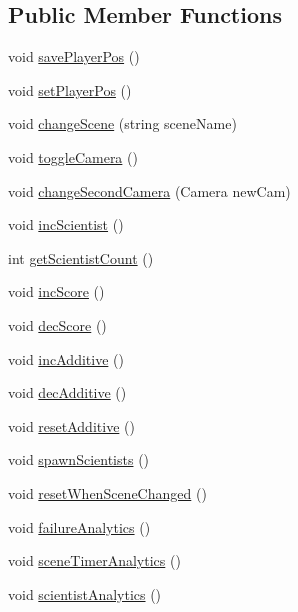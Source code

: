 \subsection*{Public Member Functions}
\begin{DoxyCompactItemize}
\item 
void \hyperlink{class_global_controller_a5a71c2551eef6be2304110c96a31cb55}{save\+Player\+Pos} ()
\item 
void \hyperlink{class_global_controller_a3424caeaad35cc27c958d453ac7586fc}{set\+Player\+Pos} ()
\item 
void \hyperlink{class_global_controller_af0ae9de1725a09bce4a16209a5b638ea}{change\+Scene} (string scene\+Name)
\item 
void \hyperlink{class_global_controller_af4ff92ac33a69fb09fd302cd775b9e96}{toggle\+Camera} ()
\item 
void \hyperlink{class_global_controller_a58e7beb6be20379f00ed7f63c0a1890a}{change\+Second\+Camera} (Camera new\+Cam)
\item 
void \hyperlink{class_global_controller_a84e2d66e0c6c9baa79963554f6f3b2bd}{inc\+Scientist} ()
\item 
int \hyperlink{class_global_controller_aa5e702709ea41c25a8a537556671ff47}{get\+Scientist\+Count} ()
\item 
void \hyperlink{class_global_controller_afe90e502d26e3585ef975555464bc323}{inc\+Score} ()
\item 
void \hyperlink{class_global_controller_a3c6c2fe54c92b170a0f0cc41c7230a09}{dec\+Score} ()
\item 
void \hyperlink{class_global_controller_afe1a424022cd73ea41fd2385db6a6189}{inc\+Additive} ()
\item 
void \hyperlink{class_global_controller_aca3ee9a56dbfaeaf1af53422d6afea44}{dec\+Additive} ()
\item 
void \hyperlink{class_global_controller_a5a65bdfd453a4b0f3a609d02872a2f73}{reset\+Additive} ()
\item 
void \hyperlink{class_global_controller_a557ce172d6b9580858646f53c354cfcb}{spawn\+Scientists} ()
\item 
void \hyperlink{class_global_controller_a8327a637a3ce3e3766e46e449f9218ff}{reset\+When\+Scene\+Changed} ()
\item 
void \hyperlink{class_global_controller_a6a9521c88ce33872ebc420e4d8bd5e48}{failure\+Analytics} ()
\item 
void \hyperlink{class_global_controller_a001ba1f6e0dab8a0e30efb94b10e926c}{scene\+Timer\+Analytics} ()
\item 
void \hyperlink{class_global_controller_a57909fe4f0acecd6591ea7eb119b5512}{scientist\+Analytics} ()
\end{DoxyCompactItemize}
